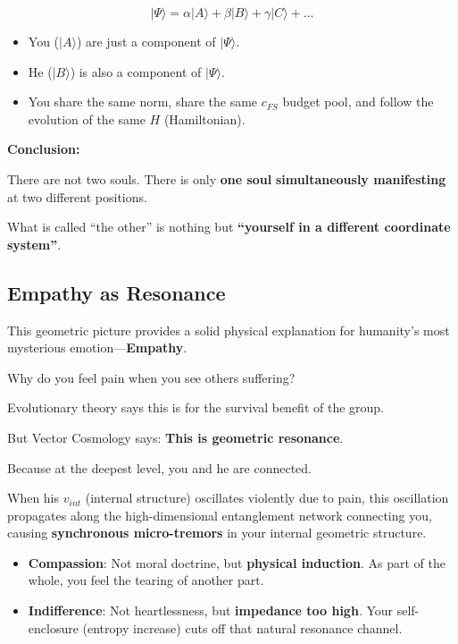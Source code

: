 \[|\Psi\rangle = \alpha |A\rangle + \beta |B\rangle + \gamma |C\rangle + \dots\]

\begin{itemize}
\item You ($|A\rangle$) are just a component of $|\Psi\rangle$.

\item He ($|B\rangle$) is also a component of $|\Psi\rangle$.

\item You share the same norm, share the same $c_{FS}$ budget pool, and follow the evolution of the same $H$ (Hamiltonian).
\end{itemize}

\textbf{Conclusion:}

There are not two souls. There is only \textbf{one soul} \textbf{simultaneously manifesting} at two different positions.

What is called ``the other'' is nothing but \textbf{``yourself in a different coordinate system''}.

\subsection{Empathy as Resonance}

This geometric picture provides a solid physical explanation for humanity's most mysterious emotion---\textbf{Empathy}.

Why do you feel pain when you see others suffering?

Evolutionary theory says this is for the survival benefit of the group.

But Vector Cosmology says: \textbf{This is geometric resonance}.

Because at the deepest level, you and he are connected.

When his $v_{int}$ (internal structure) oscillates violently due to pain, this oscillation propagates along the high-dimensional entanglement network connecting you, causing \textbf{synchronous micro-tremors} in your internal geometric structure.

\begin{itemize}
\item \textbf{Compassion}: Not moral doctrine, but \textbf{physical induction}. As part of the whole, you feel the tearing of another part.

\item \textbf{Indifference}: Not heartlessness, but \textbf{impedance too high}. Your self-enclosure (entropy increase) cuts off that natural resonance channel.
\end{itemize}

